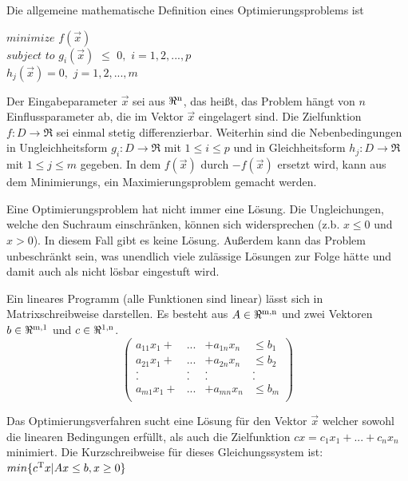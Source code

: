 \documentclass{like}
\begin{document}
Die allgemeine mathematische Definition eines Optimierungsproblems ist

 $minimize$  
  \noindent\hspace*{3mm}%
 $f(\vec{x}) $ \\
 $subject$  $to$ 
 \noindent\hspace*{3mm}%
 $g_i(\vec{x})$ $\leq$ $0,$ $i=1,2,...,p$  \\
 \noindent\hspace*{22mm}%
 $h_j(\vec{x})= 0,$ $j= 1,2,...,m$\\ 
 \noindent\hspace*{22mm}%

 
 Der Eingabeparameter $\vec{x}$ sei aus $\Re \textsuperscript{n} $, das heißt, das Problem hängt von \(n\) Einflussparameter ab, die im Vektor $\vec{x}$ eingelagert sind. Die Zielfunktion $f:D \rightarrow \Re $ sei einmal stetig differenzierbar. Weiterhin sind die Nebenbedingungen in Ungleichheitsform $g_i:D \rightarrow \Re$ mit $1\leq i \leq p$ und in Gleichheitsform $h_j:D \rightarrow \Re$ mit $1\leq j \leq m$ gegeben.
 In dem \(f(\vec{x})\) durch \(-f(\vec{x})\) ersetzt wird, kann aus dem Minimierungs, ein Maximierungsproblem gemacht werden.  
  
 Eine Optimierungsproblem hat nicht immer eine Lösung. Die Ungleichungen, welche den Suchraum einschränken, können sich widersprechen (z.b. $x \leq 0 $ und $x > 0$). In diesem Fall gibt es keine Lösung. Außerdem kann das Problem unbeschränkt sein, was unendlich viele zulässige Lösungen zur Folge hätte und damit auch als nicht lösbar eingestuft wird. 
 
 Ein lineares Programm (alle Funktionen sind linear) lässt sich in Matrixschreibweise darstellen. Es besteht aus $A \in \Re \textsuperscript{m,n}$ und zwei Vektoren $b \in \Re \textsuperscript{m,1}$ und $c \in \Re \textsuperscript{1,n}$. \\

\[ \left( \begin{array}{cccc}
a_{11} x_1 + & ... & + a_{1n} x_n & \leq b_1 \\   	
a_{21} x_1 + & ... & + a_{2n} x_n & \leq b_2 \\ 
. & . & . & . \\
. & . & . & . \\
a_{m1} x_1 + & ... & + a_{mn} x_n & \leq b_m \\
\end{array} \right)\] 
 
 Das Optimierungsverfahren sucht eine Lösung für den Vektor \(\vec{x}\) welcher sowohl die linearen Bedingungen erfüllt, als auch die Zielfunktion 
 $cx=c_1 x_1 + ... + c_n x_n$ minimiert.
 Die Kurzschreibweise für dieses Gleichungssystem ist: \\
 $min \{ c\textsuperscript{T}x | Ax \leq b, x \geq 0 \}$
 
\end{document}
